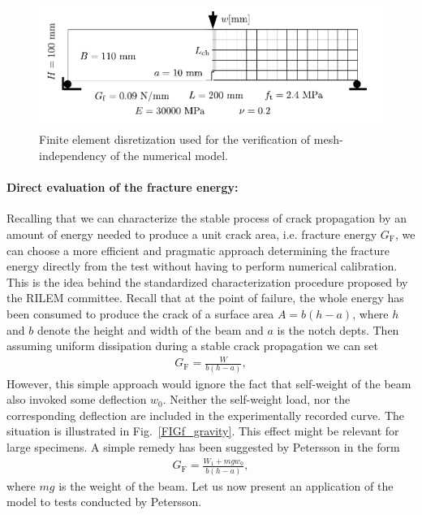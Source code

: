 \documentclass[main.tex]{subfiles}
\begin{document}
\begin{figure}
\centering
\includegraphics[width=12cm]{fig/Lecture09/figure_fe}
\caption{Finite element disretization used for the verification of mesh-independency of the numerical model.}
\label{FIGf_bending}
\end{figure}

\paragraph{Direct evaluation of the fracture energy:}
Recalling that we can characterize the stable process of crack propagation by an amount of energy needed to produce a unit crack area, i.e. fracture energy $G_\mathrm{F}$, we can choose a more efficient and pragmatic approach determining the fracture energy directly from the test without having to perform numerical calibration. This is the idea behind the standardized characterization procedure proposed by the RILEM committee. Recall that at the point of failure, the whole energy has been consumed to produce the crack of a surface area $A = b(h-a)$, where $h$ and $b$ denote the height and width of the beam and $a$ is the notch depts. Then assuming uniform dissipation during a stable crack propagation we can set
\begin{align}
G_\mathrm{F}=\frac{W}{b\left(h-a\right)},
\label{EQfracturenergyrilem}
\end{align}
However, this simple approach would ignore the fact that self-weight of the beam also invoked some deflection $w_0$. Neither the self-weight load, nor the corresponding deflection are included in the experimentally recorded curve. The situation is illustrated in Fig.~\ref{FIGf_gravity}. 
This effect might be relevant for large specimens. A simple remedy has been suggested by Petersson in the form
%
\begin{align}
G_\mathrm{F}=\frac{W_1+mgw_0}{b\left(h-a\right)},
\label{EQfracturenergyrilem}
\end{align}
where  $mg$ is the weight of the beam. Let us now present an application of the model to tests conducted by Petersson. 
\end{document}
